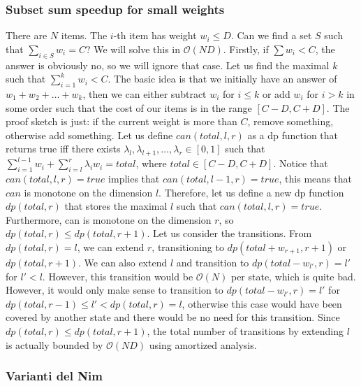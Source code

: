 \subsubsection{Subset sum speedup for small weights}
There are $N$ items. The $i$-th item has weight $w_i\leq D$. Can we find a set $S$ such that $\sum_{i\in S}w_i=C$?
We will solve this in $\mathcal{O}(ND)$. Firstly, if $\sum w_i<C$, the answer is obviously no, so we will ignore that case.
Let us find the maximal $k$ such that $\sum_{i=1}^{k}w_i<C$. The basic idea is that we initially have an answer of $w_1+w_2+\dots+w_k$, then we can either subtract $w_i$ for $i\leq k$ or add $w_i$ for $i>k$ in some order such that the cost of our items is in the range $[C-D,C+D]$. The proof sketch is just: if the current weight is more than $C$, remove something, otherwise add something.
Let us define $\mathit{can}(\mathit{total},l,r)$ as a dp function that returns true iff there exists $\lambda_l,\lambda_{l+1},\dots,\lambda_r \in [0,1]$ such that $\sum_{i=1}^{l-1}w_i+\sum_{i=l}^{r}\lambda_i w_i=\mathit{total}$, where $\mathit{total}\in[C-D,C+D]$.
Notice that $\mathit{can}(\mathit{total},l,r)=\mathit{true}$ implies that $\mathit{can}(\mathit{total},l-1,r)=\mathit{true}$, this means that $\mathit{can}$ is monotone on the dimension $l$. Therefore, let us define a new dp function $\mathit{dp}(\mathit{total},r)$ that stores the maximal $l$ such that $\mathit{can}(\mathit{total},l,r)=\mathit{true}$.
Furthermore, can is monotone on the dimension $r$, so $\mathit{dp}(\mathit{total},r)\leq \mathit{dp}(\mathit{total},r+1)$.
Let us consider the transitions.
From $\mathit{dp}(\mathit{total},r)=l$, we can extend $r$, transitioning to $\mathit{dp}(\mathit{total}+w_{r+1},r+1)$ or $\mathit{dp}(\mathit{total},r+1)$. We can also extend $l$ and transition to $\mathit{dp}(\mathit{total}-w_{l'},r)=l'$ for $l'<l$. However, this transition would be $\mathcal{O}(N)$ per state, which is quite bad.
However, it would only make sense to transition to $\mathit{dp}(\mathit{total}-w_{l'},r)=l'$ for $\mathit{dp}(\mathit{total},r-1)\leq l'<\mathit{dp}(\mathit{total},r)=l$, otherwise this case would have been covered by another state and there would be no need for this transition. Since $\mathit{dp}(\mathit{total},r)\leq \mathit{dp}(\mathit{total},r+1)$, the total number of transitions by extending $l$ is actually bounded by $\mathcal{O}(ND)$ using amortized analysis.

\subsubsection{Varianti del Nim} 
\,


